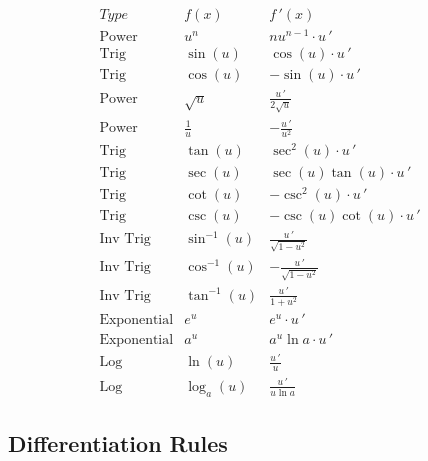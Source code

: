 \documentclass[handout]{ximera}
\begin{document}
\begin{center}
\[
\begin{array}{c|c|c}
		Type & f(x) & f\,'(x)  \\
		\hline
		\text{Power} & u^n & nu^{n-1}\cdot u\,'  \\[8pt]
		\hline
		\text{Trig} & \sin(u) & \cos (u) \cdot u\,' \\[8pt]
		\text{Trig} & \cos(u) & -\sin (u)\cdot u\,'  \\[8pt]
		\hline
		\text{Power} & \sqrt{u} & \displaystyle \frac{u\,' }{2\sqrt {u}}\\[8pt]
		\text{Power} & \displaystyle \frac{1}{u} & -\displaystyle \frac{u\,' }{u^2}\\[8pt]
	  \hline
	  \text{Trig} & \tan(u) & \sec^2 (u) \cdot u\,'  \\[8pt]
		\text{Trig} & \sec(u) & \sec (u)\tan (u) \cdot u\,'  \\[8pt]
		\hline
		\text{Trig} & \cot(u) & -\csc^2 (u) \cdot u\,'   \\[8pt]
		\text{Trig} & \csc(u) & -\csc (u)\cot (u) \cdot u\,'   \\[8pt]
		\hline
		\text{Inv Trig} & \sin^{-1} (u) &   \displaystyle \frac{u\,' }{\sqrt{1-u^2}}  \\[8pt]
		\text{Inv Trig} & \cos^{-1} (u) &   \displaystyle -\frac{u\,' }{\sqrt{1-u^2}}\\[8pt]
		\text{Inv Trig} & \tan^{-1} (u) &   \displaystyle \frac{u\,' }{1+u^2} \\[8pt]
		\hline
		\text{Exponential} & e^{u} & e^{u} \cdot u\,' \\[8pt]
		\text{Exponential} & a^{u} & a^{u}\ln a \cdot u\,' \\[8pt]
		\hline
		\text{Log} & \ln (u) &   \displaystyle \frac{u\,'}{u} \\[8pt]
		\text{Log} & \log_a (u) &   \displaystyle \frac{u\,'}{u\ln a}
	\end{array}
    \]
\end{center}



\subsection{Differentiation Rules}
\end{document}
